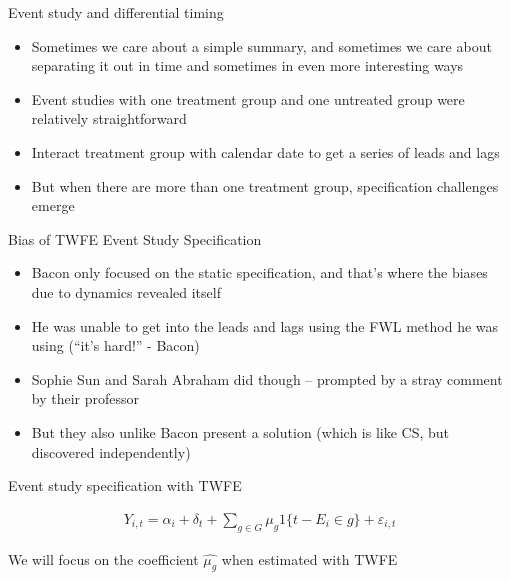 \documentclass{beamer}
\begin{document}
\begin{frame}{Event study and differential timing}

\begin{itemize}
\item Sometimes we care about a simple summary, and sometimes we care about separating it out in time and sometimes in even more interesting ways
\item Event studies with one treatment group and one untreated group were relatively straightforward
\item Interact treatment group with calendar date to get a series of leads and lags
\item But when there are more than one treatment group, specification challenges emerge
\end{itemize}

\end{frame}





\begin{frame}{Bias of TWFE Event Study Specification}

\begin{itemize}
\item Bacon only focused on the static specification, and that's where the biases due to dynamics revealed itself
\item He was unable to get into the leads and lags using the FWL method he was using (``it's hard!'' - Bacon)
\item Sophie Sun and Sarah Abraham did though -- prompted by a stray comment by their professor
\item But they also unlike Bacon present a solution (which is like CS, but discovered independently)
\end{itemize}

\end{frame}

\begin{frame}{Event study specification with TWFE}


\begin{eqnarray*}
Y_{i,t} = \alpha_i + \delta_t + \sum_{g \in G} \mu_g1\{t-E_i \in g \} + \varepsilon_{i,t}
\end{eqnarray*}

\bigskip

We will focus on the coefficient $\widehat{\mu_g}$ when estimated with TWFE

\end{frame}
\end{document}
